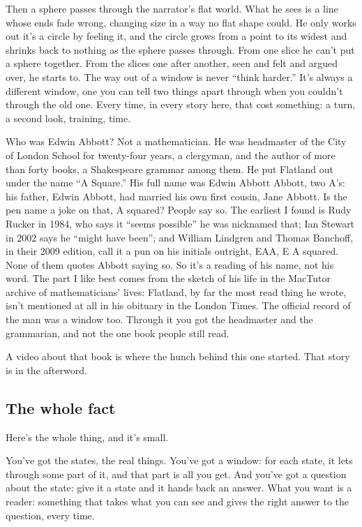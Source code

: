 \documentclass[11pt,twoside]{article}
\theoremstyle{thielethm}
\theoremstyle{thieledef}
\theoremstyle{thieledef}
\theoremstyle{thieledef}
\theoremstyle{thielethm}
\theoremstyle{thieleobs}
\theoremstyle{thielethm}
\begin{document}
Then a sphere passes through the narrator's flat world. What he sees is a line whose ends fade wrong, changing size in a way no flat shape could. He only works out it's a circle by feeling it, and the circle grows from a point to its widest and shrinks back to nothing as the sphere passes through. From one slice he can't put a sphere together. From the slices one after another, seen and felt and argued over, he starts to. The way out of a window is never ``think harder.'' It's always a different window, one you can tell two things apart through when you couldn't through the old one. Every time, in every story here, that cost something: a turn, a second look, training, time.

Who was Edwin Abbott? Not a mathematician. He was headmaster of the City of London School for twenty-four years, a clergyman, and the author of more than forty books, a Shakespeare grammar among them. He put Flatland out under the name ``A Square.'' His full name was Edwin Abbott Abbott, two A's: his father, Edwin Abbott, had married his own first cousin, Jane Abbott. Is the pen name a joke on that, A squared? People say so. The earliest I found is Rudy Rucker in 1984, who says it ``seems possible'' he was nicknamed that; Ian Stewart in 2002 says he ``might have been''; and William Lindgren and Thomas Banchoff, in their 2009 edition, call it a pun on his initials outright, EAA, E A squared. None of them quotes Abbott saying so. So it's a reading of his name, not his word. The part I like best comes from the sketch of his life in the MacTutor archive of mathematicians' lives: Flatland, by far the most read thing he wrote, isn't mentioned at all in his obituary in the London Times. The official record of the man was a window too. Through it you got the headmaster and the grammarian, and not the one book people still read.

A video about that book is where the hunch behind this one started. That story is in the afterword.

\subsection{The whole fact}

Here's the whole thing, and it's small.

You've got the states, the real things. You've got a window: for each state, it lets through some part of it, and that part is all you get. And you've got a question about the state: give it a state and it hands back an answer. What you want is a reader: something that takes what you can see and gives the right answer to the question, every time.
\end{document}
